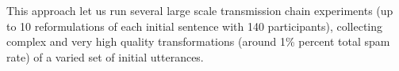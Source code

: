 \documentclass[english,]{article}
\begin{document}
This approach let us run several large scale transmission chain experiments (up to 10 reformulations of each initial sentence with 140 participants), collecting complex and very high quality transformations (around 1\% percent total spam rate) of a varied set of initial utterances.
\end{document}
